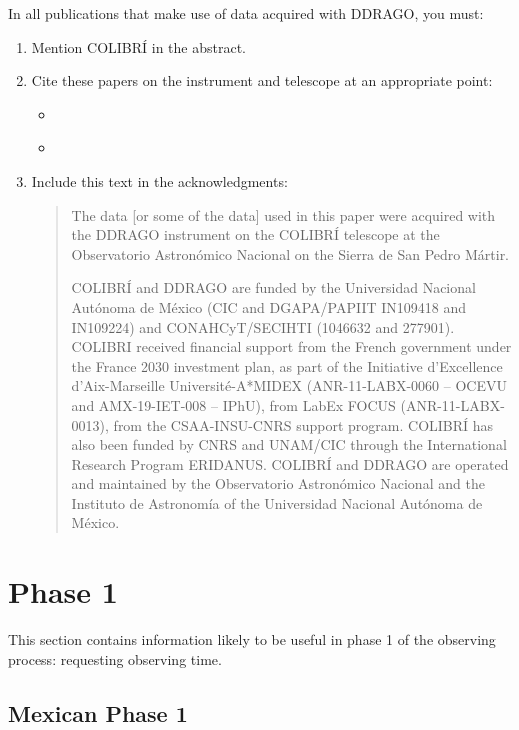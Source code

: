 In all publications that make use of data acquired with DDRAGO, you must:
\begin{enumerate}
    \item Mention COLIBRÍ in the abstract.
    \item Cite these papers on the  instrument and telescope at an appropriate point:

        \begin{itemize}
            \item \cite{Basa-2022}
            \item \cite{Langarica-2024}
        \end{itemize}

    \item Include this text in the acknowledgments:

        \begin{quote}\sloppy
            The data [or some of the data] used in this paper were acquired with the DDRAGO instrument on the COLIBRÍ telescope at the Observatorio Astronómico Nacional on the Sierra de San Pedro Mártir.

            COLIBRÍ and DDRAGO are funded by the Universidad Nacional Autónoma de México (CIC and DGAPA/PAPIIT IN109418 and IN109224) and CONAHCyT/SECIHTI (1046632 and 277901). COLIBRI received financial support from the French government under the France 2030 investment plan, as part of the Initiative d’Excellence d’Aix-Marseille Université-A*MIDEX  (ANR-11-LABX-0060 -- OCEVU and AMX-19-IET-008 -- IPhU), from LabEx FOCUS (ANR-11-LABX-0013), from the CSAA-INSU-CNRS support program. COLIBRÍ has also been funded by CNRS and UNAM/CIC through the International Research Program ERIDANUS.
            COLIBRÍ and DDRAGO are operated and maintained by the Observatorio Astronómico Nacional and the Instituto de Astronomía of the Universidad Nacional Autónoma de México.
        \end{quote}

\end{enumerate}

\section{Phase 1}
\label{section:phase-1}

This section contains information likely to be useful in phase 1 of the observing process: requesting observing time.

\subsection{Mexican Phase 1}

